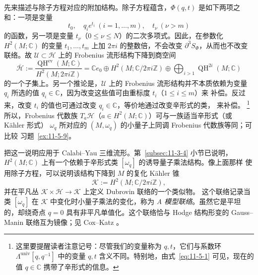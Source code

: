 先来描述与除子方程对应的附加结构。除子方程蕴含，$\Phi(q,t)$ 是如下两项之和：一项是变量
\[
  t_0,\quad q_i e^{t_i}\ (i=1,\ldots,m),\quad
  t_\nu\ (\nu>m)
\]
的函数，另一项是变量 $t_\nu$（$0\le\nu\le N$）的二次多项式。因此，在参数化
$H^2(M;\mathbb C)$ 的变量 $t_1,\ldots,t_m$ 上加 $2\pi i$ 的整数倍，不会改变
$\partial^3S_\Phi$，从而也不改变联络。故 $\mathcal U\subset\mathcal H$ 上的 Frobenius
流形结构下降到商空间
\[
  \overline{\mathcal H}
  :=\frac{\operatorname{QH}^{\mathrm{ev}}(M;\mathbb C)}
  {H^2(M;2\pi i\mathbb Z)}
  =\mathbb C e_0\oplus H^2(M;\mathbb C/2\pi i\mathbb Z)
  \oplus\bigoplus_{i>1}\operatorname{QH}^{2i}(M;\mathbb C)
\]
的一个子集上。另一个推论是，$\mathcal U$ 上的 Frobenius 流形结构并不本质依赖为变量
$q_i$ 所选的值 $q_i\in\mathbb C$，因为改变这些值可由重标度 $t_i$（$1\le i\le m$）来
补偿。反过来，改变 $t_i$ 的值也可通过改变 $q_i\in\mathbb C$，等价地通过改变辛形式的类，
来补偿。
\footnote{这里要提醒读者注意记号：尽管我们的变量称为 $q,t$，它们与系数环
$\Lambda^{\mathrm{univ}}[q,q^{-1}]$ 中的变量 $q,t$ 含义不同。特别地，由式~\eqref{eq:11-5-1}
可见，现在的值 $q\in\mathbb C$ 携带了辛形式的信息。}
所以，Frobenius 代数族
$T_a\mathcal H$（$a\in H^2(M;\mathbb C)$）可与一族适当辛形式（或 K\"ahler 形式）
$\omega_q$ 所对应的 $(M,\omega_q)$ 的小量子上同调 Frobenius 代数族等同；可比较
习题~\ref{ex:11-5-9}。

把这一说明应用于 Calabi--Yau 三维流形。第~\ref{subsec:11-3-4} 小节已说明，
$H^2(M;\mathbb C)$ 上有一个依赖于辛形式类 $[\omega_q]$ 的诱导量子乘法结构。像上面那样
使用除子方程，可以说明该结构下降到 $M$ 的复化 K\"ahler 锥
\[
  \mathcal K:=H^2(M;\mathbb C/2\pi i\mathbb Z),
\]
并在平凡丛 $\mathcal K\times\mathcal H\to\mathcal K$ 上定义 Dubrovin 联络的一个类似物。
这个联络记录当类 $[\omega_q]$ 在 $\mathcal K$ 中变化时小量子乘法的变化，称为
\emph{A 模型联络}。虽然它是平坦的，却绕奇点 $q=0$ 具有非平凡单值化。这个联络恰与 Hodge
结构形变的 Gauss--Manin 联络互为镜像；见 Cox--Katz 。

